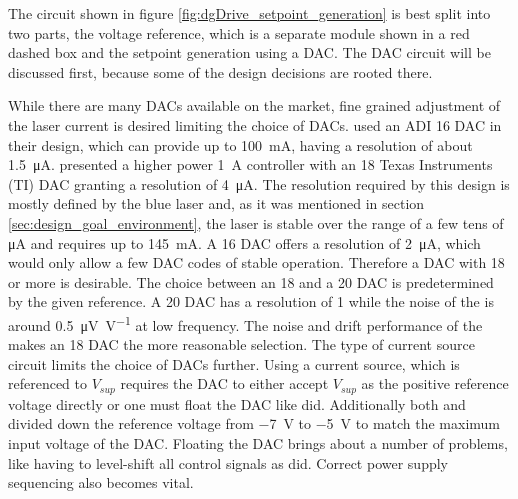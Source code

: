 The circuit shown in figure \ref{fig:dgDrive_setpoint_generation} is best split into two parts, the voltage reference, which is a separate module shown in a red dashed box and the setpoint generation using a DAC. The DAC circuit will be discussed first, because some of the design decisions are rooted there.

While there are many DACs available on the market, fine grained adjustment of the laser current is desired limiting the choice of DACs. \citeauthor{laser_driver_digital} \cite{laser_driver_digital} used an ADI  \qty{16}{\bit} DAC in their design, which can provide up to \qty{100}{\mA}, having a resolution of about \qty{1.5}{\uA}. \citeauthor{laser_driver_qcl_taubman_multiplexer} \cite{laser_driver_qcl_taubman_multiplexer} presented a higher power \qty{1}{\A} controller with an \qty{18}{\bit} Texas Instruments (TI)  DAC granting a resolution of \qty{4}{\uA}. The resolution required by this design is mostly defined by the blue laser and, as it was mentioned in section \ref{sec:design_goal_environment}, the laser is stable over the range of a few tens of \unit{\uA} and requires up to \qty{145}{\mA}. A \qty{16}{\bit} DAC offers a resolution of \qty{2}{\uA}, which would only allow a few DAC codes of stable operation. Therefore a DAC with \qty{18}{\bit} or more is desirable. The choice between an \qty{18}{\bit} and a \qty{20}{\bit} DAC is predetermined by the given reference. A \qty{20}{\bit} DAC has a resolution of \qty{1}{\ppm} while the noise of the  is around \qty{0.5}{\uV \per \V} at low frequency. The noise and drift performance \cite{datasheet_LM399} of the  makes an \qty{18}{\bit} DAC the more reasonable selection. The type of current source circuit limits the choice of DACs further. Using a current source, which is referenced to $V_{sup}$ requires the DAC to either accept $V_{sup}$ as the positive reference voltage directly or one must float the DAC like \citeauthor{laser_driver_digital} \cite{laser_driver_digital} did. Additionally both \citeauthor{laser_driver_digital} \cite{laser_driver_digital} and \citeauthor{laser_driver_qcl_taubman_multiplexer} \cite{laser_driver_qcl_taubman_multiplexer} divided down the reference voltage from \qty{-7}{\V} to \qty{-5}{\V} to match the maximum input voltage of the DAC. Floating the DAC brings about a number of problems, like having to level-shift all control signals as \citeauthor{laser_driver_digital} \cite{laser_driver_digital} did. Correct power supply sequencing also becomes vital.

